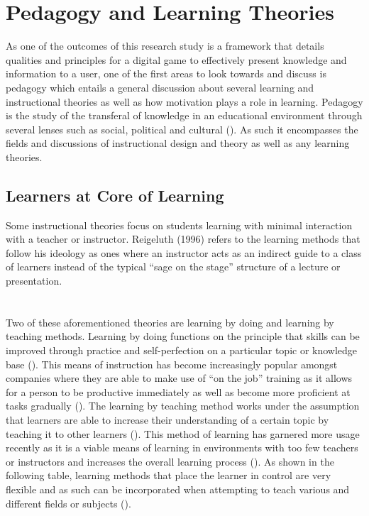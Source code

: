 \section{Pedagogy and Learning Theories}
As one of the outcomes of this research study is a framework that details qualities and principles for a digital game to effectively present knowledge and information to a user, one of the first areas to look towards and discuss is pedagogy which entails a general discussion about several learning and instructional theories as well as how motivation plays a role in learning. Pedagogy is the study of the transferal of knowledge in an educational environment through several lenses such as social, political and cultural (\cite{Li2012}). As such it encompasses the fields and discussions of instructional design and theory as well as any learning theories.

\subsection{Learners at Core of Learning}
Some instructional theories focus on students learning with minimal interaction with a teacher or instructor. Reigeluth (1996) refers to the learning methods that follow his ideology as ones where an instructor acts as an indirect guide to a class of learners instead of the typical “sage on the stage” structure of a lecture or presentation. 
\\\\\\
Two of these aforementioned theories are learning by doing and learning by teaching methods. Learning by doing functions on the principle that skills can be improved through practice and self-perfection on a particular topic or knowledge base (\cite{Fisch2009}). This means of instruction has become increasingly popular amongst companies where they are able to make use of “on the job” training as it allows for a person to be productive immediately as well as become more proficient at tasks gradually (\cite{Fisch2009}). The learning by teaching method works under the assumption that learners are able to increase their understanding of a certain topic by teaching it to other learners (\cite{Fisch2009}). This method of learning has garnered more usage recently as it is a viable means of learning in environments with too few teachers or instructors and increases the overall learning process (\cite{Fisch2009}). As shown in the following table, learning methods that place the learner in control are very flexible and as such can be incorporated when attempting to teach various and different fields or subjects (\cite{Ackoff1991}).

